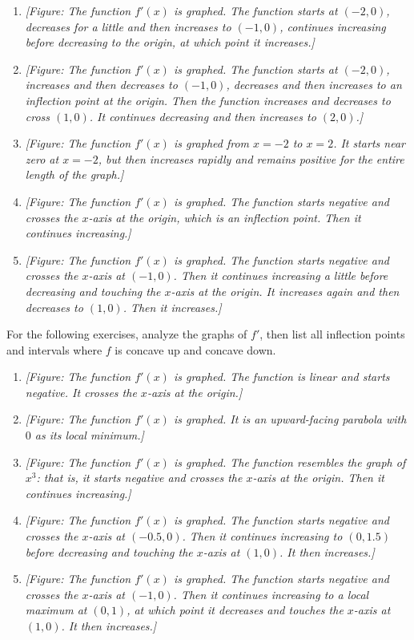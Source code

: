 \documentclass{exercises}
\begin{document}
\begin{enumerate}[resume]
\item \textit{[Figure: The function $f'(x)$ is graphed. The function starts at $(-2,0)$, decreases for a little and then increases to $(-1,0)$, continues increasing before decreasing to the origin, at which point it increases.]}
\item \textit{[Figure: The function $f'(x)$ is graphed. The function starts at $(-2,0)$, increases and then decreases to $(-1,0)$, decreases and then increases to an inflection point at the origin. Then the function increases and decreases to cross $(1,0)$. It continues decreasing and then increases to $(2,0)$.]}
\item \textit{[Figure: The function $f'(x)$ is graphed from $x=-2$ to $x=2$. It starts near zero at $x=-2$, but then increases rapidly and remains positive for the entire length of the graph.]}
\item \textit{[Figure: The function $f'(x)$ is graphed. The function starts negative and crosses the $x$-axis at the origin, which is an inflection point. Then it continues increasing.]}
\item \textit{[Figure: The function $f'(x)$ is graphed. The function starts negative and crosses the $x$-axis at $(-1,0)$. Then it continues increasing a little before decreasing and touching the $x$-axis at the origin. It increases again and then decreases to $(1,0)$. Then it increases.]}
\end{enumerate}

For the following exercises, analyze the graphs of $f'$, then list all inflection points and intervals where $f$ is concave up and concave down.

\begin{enumerate}[resume]
\item \textit{[Figure: The function $f'(x)$ is graphed. The function is linear and starts negative. It crosses the $x$-axis at the origin.]}
\item \textit{[Figure: The function $f'(x)$ is graphed. It is an upward-facing parabola with $0$ as its local minimum.]}
\item \textit{[Figure: The function $f'(x)$ is graphed. The function resembles the graph of $x^{3}$: that is, it starts negative and crosses the $x$-axis at the origin. Then it continues increasing.]}
\item \textit{[Figure: The function $f'(x)$ is graphed. The function starts negative and crosses the $x$-axis at $(-0.5,0)$. Then it continues increasing to $(0,1.5)$ before decreasing and touching the $x$-axis at $(1,0)$. It then increases.]}
\item \textit{[Figure: The function $f'(x)$ is graphed. The function starts negative and crosses the $x$-axis at $(-1,0)$. Then it continues increasing to a local maximum at $(0,1)$, at which point it decreases and touches the $x$-axis at $(1,0)$. It then increases.]}
\end{enumerate}
\end{document}
